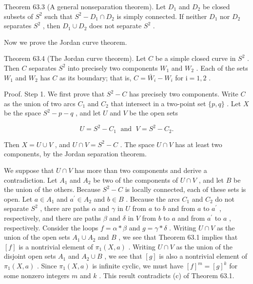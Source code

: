 \documentclass[10pt]{article}
\begin{document}
Theorem 63.3 (A general nonseparation theorem). Let \({D}_{1}\) and \({D}_{2}\) be closed subsets of \({S}^{2}\) such that \({S}^{2} - {D}_{1} \cap  {D}_{2}\) is simply connected. If neither \({D}_{1}\) nor \({D}_{2}\) separates \({S}^{2}\) , then \({D}_{1} \cup  {D}_{2}\) does not separate \({S}^{2}\) .

Now we prove the Jordan curve theorem.

Theorem 63.4 (The Jordan curve theorem). Let \(C\) be a simple closed curve in \({S}^{2}\) . Then \(C\) separates \({S}^{2}\) into precisely two components \({W}_{1}\) and \({W}_{2}\) . Each of the sets \({W}_{1}\) and \({W}_{2}\) has \(C\) as its boundary; that is, \(C = {\bar{W}}_{i} - {W}_{i}\) for \(\mathrm{i} = 1,2\) .

Proof. Step 1. We first prove that \({S}^{2} - C\) has precisely two components. Write \(C\) as the union of two arcs \({C}_{1}\) and \({C}_{2}\) that intersect in a two-point set \(\{ p,q\}\) . Let \(X\) be the space \({S}^{2} - p - q\) , and let \(U\) and \(V\) be the open sets

\[
U = {S}^{2} - {C}_{1}\;\text{ and }\;V = {S}^{2} - {C}_{2}.
\]

Then \(X = U \cup  V\) , and \(U \cap  V = {S}^{2} - C\) . The space \(U \cap  V\) has at least two components, by the Jordan separation theorem.

We suppose that \(U \cap  V\) has more than two components and derive a contradiction. Let \({A}_{1}\) and \({A}_{2}\) be two of the components of \(U \cap  V\) , and let \(B\) be the union of the others. Because \({S}^{2} - C\) is locally connected, each of these sets is open. Let \(a \in  {A}_{1}\) and \({a}^{\prime } \in  {A}_{2}\) and \(b \in  B\) . Because the arcs \({C}_{1}\) and \({C}_{2}\) do not separate \({S}^{2}\) , there are paths \(\alpha\) and \(\gamma\) in \(U\) from \(a\) to \(b\) and from \(a\) to \({a}^{\prime }\) , respectively, and there are paths \(\beta\) and \(\delta\) in \(V\) from \(b\) to \(a\) and from \({a}^{\prime }\) to \(a\) , respectively. Consider the loops \(f = \alpha  * \beta\) and \(g = \gamma  * \delta\) . Writing \(U \cap  V\) as the union of the open sets \({A}_{1} \cup  {A}_{2}\) and \(B\) , we see that Theorem 63.1 implies that \(\left\lbrack  f\right\rbrack\) is a nontrivial element of \({\pi }_{1}\left( {X,a}\right)\) . Writing \(U \cap  V\) as the union of the disjoint open sets \({A}_{1}\) and \({A}_{2} \cup  B\) , we see that \(\left\lbrack  g\right\rbrack\) is also a nontrivial element of \({\pi }_{1}\left( {X,a}\right)\) . Since \({\pi }_{1}\left( {X,a}\right)\) is infinite cyclic, we must have \({\left\lbrack  f\right\rbrack  }^{m} = {\left\lbrack  g\right\rbrack  }^{k}\) for some nonzero integers \(m\) and \(k\) . This result contradicts (c) of Theorem 63.1.
\end{document}
